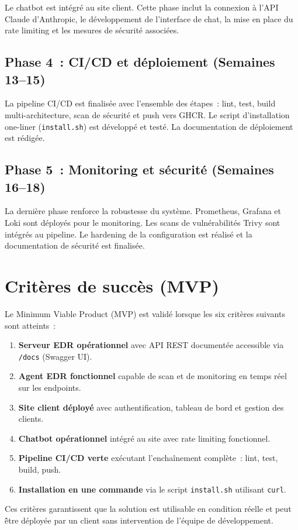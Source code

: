 Le chatbot est int\'egr\'e au site client. Cette phase inclut la
connexion \`a l'API Claude d'Anthropic, le d\'eveloppement de
l'interface de chat, la mise en place du rate limiting et les mesures
de s\'ecurit\'e associ\'ees.

\subsection{Phase 4~: CI/CD et d\'eploiement (Semaines 13--15)}

La pipeline CI/CD est finalis\'ee avec l'ensemble des \'etapes~: lint,
test, build multi-architecture, scan de s\'ecurit\'e et push vers
GHCR. Le script d'installation one-liner (\texttt{install.sh}) est
d\'evelopp\'e et test\'e. La documentation de d\'eploiement est
r\'edig\'ee.

\subsection{Phase 5~: Monitoring et s\'ecurit\'e (Semaines 16--18)}

La derni\`ere phase renforce la robustesse du syst\`eme. Prometheus,
Grafana et Loki sont d\'eploy\'es pour le monitoring. Les scans de
vuln\'erabilit\'es Trivy sont int\'egr\'es au pipeline. Le hardening
de la configuration est r\'ealis\'e et la documentation de s\'ecurit\'e
est finalis\'ee.

\section{Crit\`eres de succ\`es (MVP)}

Le Minimum Viable Product (MVP) est valid\'e lorsque les six crit\`eres
suivants sont atteints~:

\begin{enumerate}
  \item \textbf{Serveur EDR op\'erationnel} avec API REST document\'ee
    accessible via \texttt{/docs} (Swagger UI).
  \item \textbf{Agent EDR fonctionnel} capable de scan et de monitoring
    en temps r\'eel sur les endpoints.
  \item \textbf{Site client d\'eploy\'e} avec authentification, tableau
    de bord et gestion des clients.
  \item \textbf{Chatbot op\'erationnel} int\'egr\'e au site avec rate
    limiting fonctionnel.
  \item \textbf{Pipeline CI/CD verte} ex\'ecutant l'encha\^inement
    complète~: lint, test, build, push.
  \item \textbf{Installation en une commande} via le script
    \texttt{install.sh} utilisant \texttt{curl}.
\end{enumerate}

Ces crit\`eres garantissent que la solution est utilisable en
condition r\'eelle et peut \^être d\'eploy\'ee par un client sans
intervention de l'\'equipe de d\'eveloppement.
